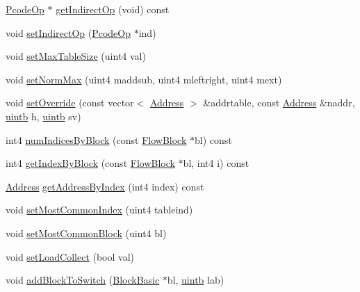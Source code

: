 \begin{DoxyCompactItemize}
\item 
\mbox{\hyperlink{class_pcode_op}{Pcode\+Op}} $\ast$ \mbox{\hyperlink{class_jump_table_a0edd5fb3fed20b0f5b62b10eb45d7acf}{get\+Indirect\+Op}} (void) const
\item 
void \mbox{\hyperlink{class_jump_table_a999b901e638cfc2243b0e7578355c662}{set\+Indirect\+Op}} (\mbox{\hyperlink{class_pcode_op}{Pcode\+Op}} $\ast$ind)
\item 
void \mbox{\hyperlink{class_jump_table_a402a16fcfbb3f1aa4e18e92e449299d0}{set\+Max\+Table\+Size}} (uint4 val)
\item 
void \mbox{\hyperlink{class_jump_table_a436e2a0d77555f2f69edc3e7c0ca5227}{set\+Norm\+Max}} (uint4 maddsub, uint4 mleftright, uint4 mext)
\item 
void \mbox{\hyperlink{class_jump_table_a3e013d86f11f8df367c3979dd6310163}{set\+Override}} (const vector$<$ \mbox{\hyperlink{class_address}{Address}} $>$ \&addrtable, const \mbox{\hyperlink{class_address}{Address}} \&naddr, \mbox{\hyperlink{types_8h_a2db313c5d32a12b01d26ac9b3bca178f}{uintb}} h, \mbox{\hyperlink{types_8h_a2db313c5d32a12b01d26ac9b3bca178f}{uintb}} sv)
\item 
int4 \mbox{\hyperlink{class_jump_table_a3ff393c996f2c495f86917927c451dfe}{num\+Indices\+By\+Block}} (const \mbox{\hyperlink{class_flow_block}{Flow\+Block}} $\ast$bl) const
\item 
int4 \mbox{\hyperlink{class_jump_table_abc8399a772fe0bd6bbcb94304af98d5b}{get\+Index\+By\+Block}} (const \mbox{\hyperlink{class_flow_block}{Flow\+Block}} $\ast$bl, int4 i) const
\item 
\mbox{\hyperlink{class_address}{Address}} \mbox{\hyperlink{class_jump_table_ab55c26932c2133039fa2cce13ba3742b}{get\+Address\+By\+Index}} (int4 index) const
\item 
void \mbox{\hyperlink{class_jump_table_a0537814cab892d9a6fa6342cd4b2f1fd}{set\+Most\+Common\+Index}} (uint4 tableind)
\item 
void \mbox{\hyperlink{class_jump_table_ae0dbbb3a114d754264eb2b45ee243b32}{set\+Most\+Common\+Block}} (uint4 bl)
\item 
void \mbox{\hyperlink{class_jump_table_a837e0e4ccf4f0be70df4f9b55106305a}{set\+Load\+Collect}} (bool val)
\item 
void \mbox{\hyperlink{class_jump_table_a0cb2459aa5c38bda12cfb8be1ac6fcfe}{add\+Block\+To\+Switch}} (\mbox{\hyperlink{class_block_basic}{Block\+Basic}} $\ast$bl, \mbox{\hyperlink{types_8h_a2db313c5d32a12b01d26ac9b3bca178f}{uintb}} lab)
\item 

\end{DoxyCompactItemize}
